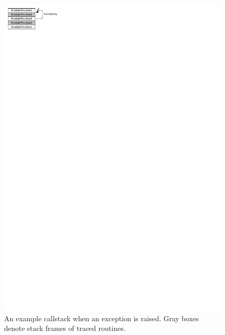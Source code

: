 \begin{figure}[htbp] 
\begin{centering} 
\includegraphics[scale=1.2, clip=true, viewport=0cm 27cm 5.5cm 30cm]{images/diagrams/Exception.pdf} 
\caption[An example callstack when an exception is raised]{An example callstack when an exception is raised. Gray boxes denote stack frames of traced routines.} 
\label{Exception} 
\end{centering} 
\end{figure}

